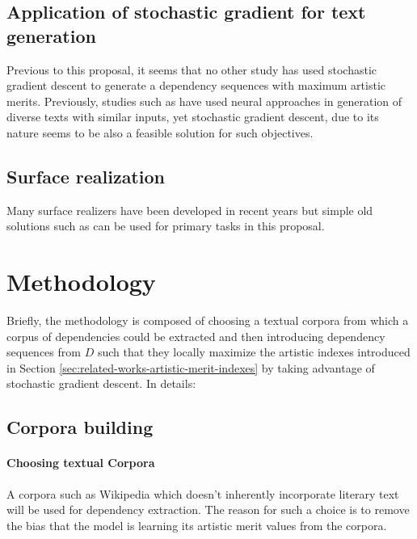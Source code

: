 \documentclass{article}
\begin{document}
	\subsection{Application of stochastic gradient for text generation} 
	Previous to this proposal, it seems that no other study has used stochastic gradient descent to generate a dependency sequences with maximum artistic merits. Previously, studies such as  \citep{welleck-2019-neural-text-generation-with-unlikelihood-training,wellek-2019-non-monotonic-sequential-text-generation,welleck-2019-neural-text-generation-with-unlikelihood-training} have used neural approaches in generation of diverse texts with similar inputs, yet stochastic gradient descent, due to its nature seems to be also a feasible solution for such objectives.   
	
	\subsection{Surface realization} \label{sec:related-works-surface-realization} 
	Many surface realizers have been developed in recent years \citep{gatt-2009-simplenlg-a-realisation-engine-for-practical-applications,belz-2012-the-surface-realisation-task-recent-developments-and-future-plans} but simple old solutions such as \cite{lavoie-1999-a-fast-and-portable-realizer-for-text-generation-systems} can be used for primary tasks in this proposal.  
	
	\section{Methodology} \label{sec:methodology}
	Briefly, the methodology is composed of choosing a textual corpora from which a corpus of dependencies could be extracted and then introducing dependency sequences from $D$ such that they locally maximize the artistic indexes introduced in Section \ref{sec:related-works-artistic-merit-indexes} by taking advantage of stochastic gradient descent. In details:
	\subsection{Corpora building}
	\paragraph{Choosing textual Corpora} A corpora such as Wikipedia which doesn't inherently incorporate literary text will be used for dependency extraction. The reason for such a choice is to remove the bias that the model is learning its artistic merit values from the corpora. 
\end{document}
